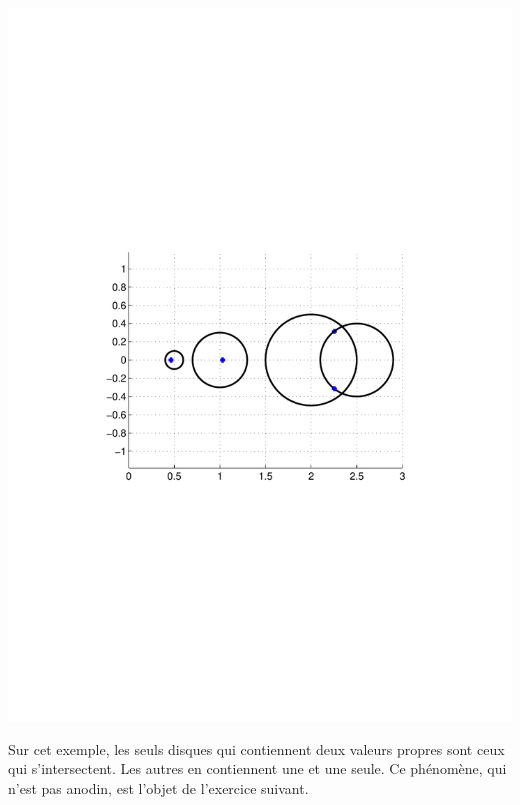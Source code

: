 \begin{minipage}{0.45\columnwidth}
\includegraphics[width = \columnwidth]{gersh.pdf}
\end{minipage}

Sur cet exemple, les seuls disques qui contiennent deux valeurs propres sont
ceux qui s'intersectent. Les autres en contiennent une et une seule. Ce
phénomène, qui n'est pas anodin, est l'objet de l'exercice suivant.

